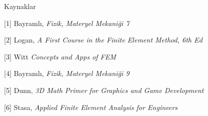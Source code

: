 \documentclass[12pt,fleqn]{article}\usepackage{../../common}
\begin{document}
Kaynaklar

[1] Bayramlı, {\em Fizik, Materyel Mekaniği 7}

[2] Logan, {\em A First Course in the Finite Element Method, 6th Ed}

[3] Witt {\em Concepts and Apps of FEM}

[4] Bayramlı, {\em Fizik, Materyel Mekaniği 9}

[5] Dunn, {\em 3D Math Primer for Graphics and Game Development}

[6] Stasa, {\em Applied Finite Element Analysis for Engineers}
\end{document}
